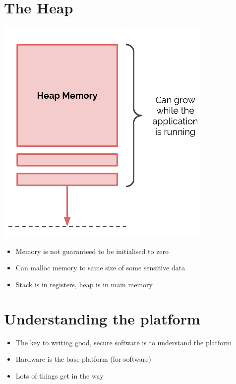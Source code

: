 \documentclass{article}[18pt]
\begin{document}
\section{The Heap}
\begin{center}
	\includegraphics[scale=0.7]{heap}
\end{center}
\begin{itemize}
	\item Memory is not guaranteed to be initialised to zero
	\item Can malloc memory to same size of some sensitive data
	\item Stack is in registers, heap is in main memory
\end{itemize}
\section{Understanding the platform}
\begin{itemize}
	\item The key to writing good, secure software is to understand the platform
	\item Hardware is the base platform (for software)
	\item Lots of things get in the way
\end{itemize}
\end{document}
